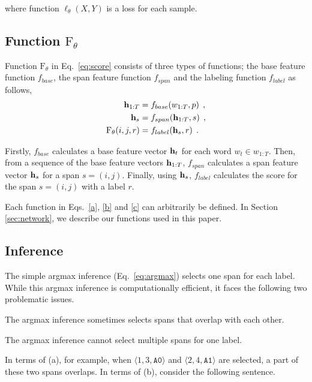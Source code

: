 \documentclass[11pt,a4paper]{article}
\begin{document}
\noindent
where function $\ell_{\theta}(X, Y)$ is a loss for each sample.

\subsection{Function $\text{F}_{\theta}$}
\label{sec:function}
Function $\text{F}_{\theta}$ in Eq.~\ref{eq:score} consists of three types of functions; the base feature function $f_{base}$, the span feature function $f_{span}$ and the labeling function $f_{label}$ as follows,
\begin{align}
\label{a} {\bf h}_{1:T} & = f_{base}(w_{1:T}, p) \:\:, \\
\label{b} {\bf h}_s & = f_{span}({\bf h}_{1:T}, s) \:\:, \\
\label{c} \text{F}_{\theta}(i, j, r) & = f_{label}({\bf h}_s, r) \:\:.
\end{align}

\noindent
Firstly, $f_{base}$ calculates a base feature vector ${\bf h}_t$ for each word $w_t \in w_{1:T}$.
Then, from a sequence of the base feature vectors ${\bf h}_{1:T}$, $f_{span}$ calculates a span feature vector ${\bf h}_s$ for a span $s = (i, j)$.
Finally, using ${\bf h}_s$, $f_{label}$ calculates the score for the span $s = (i, j)$ with a label $r$.

Each function in Eqs.~\ref{a}, \ref{b} and \ref{c} can arbitrarily be defined.
In Section \ref{sec:network}, we describe our functions used in this paper.

\subsection{Inference}
\label{sec:inference}

The simple argmax inference (Eq.~\ref{eq:argmax}) selects one span for each label.
While this argmax inference is computationally efficient, it faces the following two problematic issues.
\begin{description}
\setlength{\parskip}{0cm} 
\setlength{\itemsep}{0cm} 
\item[(a)] The argmax inference sometimes selects spans that overlap with each other.
\item[(b)] The argmax inference cannot select multiple spans for one label.
\end{description}

\noindent
In terms of (a), for example, when $\langle 1, 3, \texttt{A0} \rangle$ and $\langle 2, 4, \texttt{A1} \rangle$ are selected, a part of these two spans overlaps.
In terms of (b), consider the following sentence.\\\vspace{-0.2cm}
\end{document}
